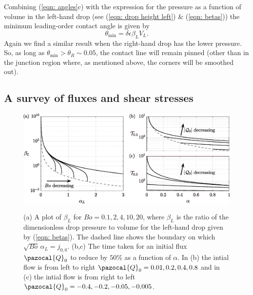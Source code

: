 \documentclass{jfm}
\begin{document}
Combining (\ref{eqn: angles}c) with the expression for the pressure as a function of volume in the left-hand drop (see (\ref{eqn: drop height left}) \&  (\ref{eqn: betas})) the minimum leading-order contact angle is given by 
\begin{equation}
\theta_{\text{min}} =  \delta \epsilon \beta_L  V_L. 
\end{equation}
Again we find  a  similar result when the right-hand drop has the lower pressure.
So, as long as $\theta_{\text{min}} > \theta_R \sim 0.05 $, the contact line will remain pinned (other than in the junction region where, as mentioned above, the corners will be smoothed out).


 

 \subsection{A survey of fluxes and shear stresses} 
 \label{sec: trends}
 
 

\begin{figure} 
\centering
 {\includegraphics[width=1\linewidth]{Figures/Parameters_V2}}  
  \caption{ 
(a) A plot of $  \beta_L   $    for $Bo = 0.1, 2, 4, 10, 20$, where $\beta_L$ is the ratio of the dimensionless  drop pressure to volume for the left-hand drop  given by (\ref{eqn: betas}). 
The dashed line shows the boundary on  which  $\sqrt{Bo}\, \alpha_L = j_{0,0} $. 
  (b,c) The time taken for an initial flux $\pazocal{Q}_0$  to reduce by $50\%  $  as a function of $\alpha$. In (b) the intial flow is from left to right $\pazocal{Q}_0 = 0.01, 0.2, 0.4, 0.8$  and in (c) the intial flow is from right to left $\pazocal{Q}_0 =  -0.4, -0.2,  -0.05, -0.005$.
  } \label{fig: alpha beta}
\end{figure}
\end{document}
